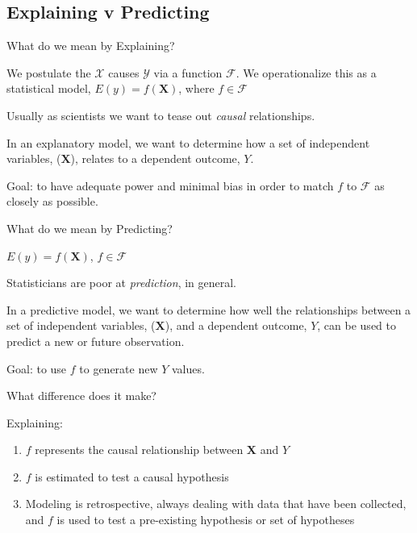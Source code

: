 \documentclass[10pt,ignorenonframetext,]{beamer}
\providecommand{\tightlist}{%
\setlength{\itemsep}{0pt}\setlength{\parskip}{0pt}}
\begin{document}
\subsection{Explaining v Predicting}\label{explaining-v-predicting}

\begin{frame}{What do we mean by Explaining?}

We postulate the \(\mathcal{X}\) causes \(\mathcal{Y}\) via a function
\(\mathcal{F}\). We operationalize this as a statistical model,
\(E(y)=f(\boldsymbol{X})\), where \(f\in\mathcal{F}\)

Usually as scientists we want to tease out \emph{causal} relationships.

In an explanatory model, we want to determine how a set of independent
variables, (\(\boldsymbol{X}\)), relates to a dependent outcome, \(Y\).

Goal: to have adequate power and minimal bias in order to match \(f\) to
\(\mathcal{F}\) as closely as possible.

\end{frame}

\begin{frame}{What do we mean by Predicting?}

\(E(y)=f(\boldsymbol{X})\), \(f\in\mathcal{F}\)

Statisticians are poor at \emph{prediction}, in general.

In a predictive model, we want to determine how well the relationships
between a set of independent variables, (\(\boldsymbol{X}\)), and a
dependent outcome, \(Y\), can be used to predict a new or future
observation.

Goal: to use \(f\) to generate new \(Y\) values.

\end{frame}

\begin{frame}{What difference does it make?}

Explaining:

\begin{enumerate}[<+->]
\def\labelenumi{\arabic{enumi}.}
\tightlist
\item
  \(f\) represents the causal relationship between \(\boldsymbol{X}\)
  and \(Y\)
\item
  \(f\) is estimated to test a causal hypothesis
\item
  Modeling is retrospective, always dealing with data that have been
  collected, and \(f\) is used to test a pre-existing hypothesis or set
  of hypotheses
\end{enumerate}

\end{frame}
\end{document}
